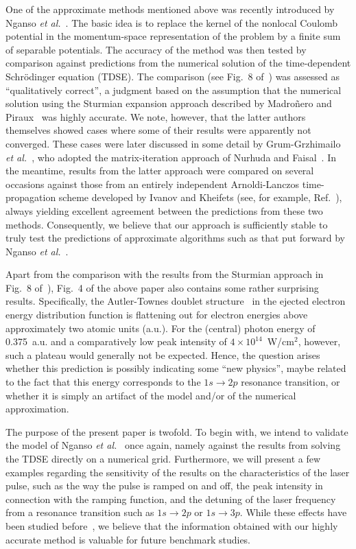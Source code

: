 \documentclass[12pt,aps,pra,amsmath,amssymb,showpacs,twocolumn,preprintnumbers,
floatfix,letterpaper]{revtex4-1}
\begin{document}
One of the approximate methods mentioned above was recently introduced by Nganso {\it et al.}~\cite{PhysRevA.83.013401}. The basic idea is to replace the kernel of the non\-local Coulomb potential in the momentum-space representation of the problem by a finite sum of separable potentials. The accuracy of the method was then tested by comparison against predictions from the numerical solution of the time-dependent Schr\"odinger equation (TDSE). The comparison (see Fig.~8 of~\cite{PhysRevA.83.013401}) was assessed as ``qualitatively correct'', a judgment based on the assumption that the numerical solution using the Sturmian expansion approach described by Madro\~nero and Piraux~\cite{PhysRevA.80.033409} was highly accurate. We note, however, that the latter authors themselves showed cases where some of their results were apparently not converged. These cases were later discussed in some detail by Grum-Grzhimailo {\it et al.}~\cite{PhysRevA.81.043408}, who adopted
the matrix-iteration approach of Nurhuda and Faisal~\cite{PhysRevA.60.3125}. In the meantime, results from the latter approach were compared on several occasions against those from an entirely independent Arnoldi-Lanczos time-propagation scheme developed by Ivanov and Kheifets (see, for example, Ref.~\cite{Pullen:11}), always yielding excellent agreement between the predictions from these two methods. Consequently, we believe that our approach is sufficiently stable to truly test the predictions of approximate algorithms such as that put forward by Nganso {\it et al.}~\cite{PhysRevA.83.013401}.

Apart from the comparison with the results from the Sturmian approach in Fig.~8 of~\cite{PhysRevA.83.013401}), Fig.~4 of the above paper also contains some rather surprising results. Specifically, the Autler-Townes doublet structure~\cite{PhysRev.100.703} in the ejected electron energy distribution function is flattening
out for electron energies above approximately two atomic units (a.u.). For the (central) photon energy of 0.375~a.u. and a comparatively low peak intensity of $4 \times 10^{14}$~W/cm$^2$, however, such a plateau would generally not be expected. Hence, the question arises whether this prediction is possibly indicating
some ``new physics'', maybe related to the fact that this energy corresponds to the $1s \to 2p$ resonance transition, or whether it is simply an artifact of the model and/or of the numerical approximation. 

The purpose of the present paper is two\-fold. To begin with, we intend to validate the model of Nganso {\it et al.}~\cite{PhysRevA.83.013401} once again, namely against the results from solving the TDSE directly on a numerical grid. Furthermore, we will present a few examples regarding the sensitivity of the results on the characteristics of the laser pulse, such as the way the pulse is ramped on and off, the peak intensity in connection with the ramping function, and the detuning of the laser frequency from a resonance transition such as $1s \to 2p$ or $1s \to 3p$. While these effects have been studied before~\cite{otherpapers}, we believe that the information obtained with our highly accurate method is valuable for future benchmark studies.
\end{document}
